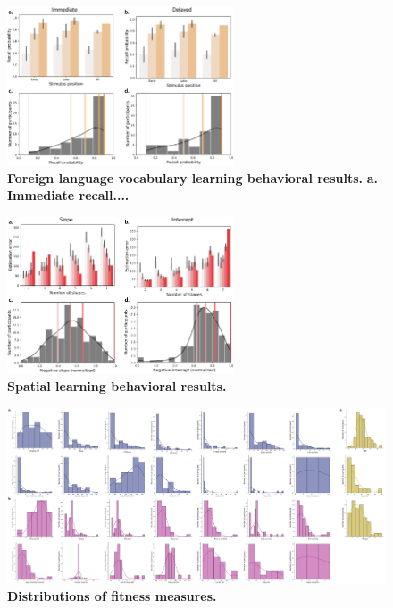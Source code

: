 \documentclass[10pt]{article}
\begin{document}
\begin{figure}[p]
\centering
\includegraphics[width=0.6\textwidth]{figs/vocab_learning_behavior}
\caption{\textbf{Foreign language vocabulary learning behavioral
    results.}  \textbf{a. Immediate recall....}}
\label{fig:vocab_behavioral}
\end{figure}

\begin{figure}[p]
\centering
\includegraphics[width=0.6\textwidth]{figs/spatial_learning_behavior}
\caption{\textbf{Spatial learning behavioral results.}}
\label{fig:spatial_behavioral}
\end{figure}

\begin{figure}
\centering
\includegraphics[width=\textwidth]{figs/fitness_distributions}
\caption{\textbf{Distributions of fitness measures.}}
\label{fig:fitness_dists}
\end{figure}
\end{document}
